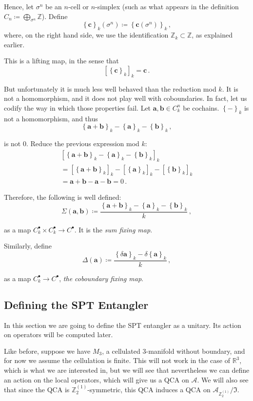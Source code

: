 \documentclass[aps,twocolumn,prx,floatfix,preprintnumbers, nofootinbib,10pt]{revtex4-2}
\numberwithin{equation}{section}
\theoremstyle{definition}
\theoremstyle{remark}
\theoremstyle{claim}
\newcommand{\be}{\begin{equation}}
\newcommand{\ee}{\end{equation}}
\newcommand{\lbb}{\left[}
\newcommand{\rbb}{\right]}
\newcommand{\lbbb}{\left\{}
\newcommand{\rbbb}{\right\}}
\newcommand{\Z}{{\mathbb Z}}
\newcommand{\mc}[1]{\mathcal{#1}}
\begin{document}
Hence, let $\sigma^n$ be an $n$-cell or $n$-simplex (such as what appears in the definition $C_n \coloneqq \bigoplus_{\sigma^n} \Z$). Define
\be
\lbbb \bm{c} \rbbb_k (\sigma^n) \coloneqq \lbbb \bm{c}(\sigma^n) \rbbb_k \,,
\ee
where, on the right hand side, we use the identification $\Z_k \subset \Z$, as explained earlier.

This is a lifting map, in the sense that
\be
\lbb \lbbb \bm{c} \rbbb_k \rbb_k = \bm{c} \,.
\ee

But unfortunately it is much less well behaved than the reduction mod $k$. It is not a homomorphism, and it does not play well with coboundaries. In fact, let us codify the way in which those properties fail. Let $\bm{a}, \bm{b} \in C^n_k$ be cochains. $\lbbb - \rbbb_k$ is not a homomorphism, and thus
\be
\lbbb \bm{a} + \bm{b} \rbbb_k - \lbbb \bm{a} \rbbb_k - \lbbb \bm{b} \rbbb_k \,,
\ee

is not 0. Reduce the previous expression mod $k$:
\begin{multline}
 \lbb \lbbb \bm{a} + \bm{b} \rbbb_k - \lbbb \bm{a} \rbbb_k - \lbbb \bm{b} \rbbb_k \rbb_k \\
 = \lbb \lbbb \bm{a} + \bm{b} \rbbb_k \rbb_k - \lbb \lbbb \bm{a} \rbbb_k \rbb_k - \lbb \lbbb \bm{b} \rbbb_k \rbb_k \\
 = \bm{a} + \bm{b} - \bm{a} - \bm{b} = 0 \,.
\end{multline}

Therefore, the following is well defined:
\be
\Sigma(\bm{a}, \bm{b}) \coloneqq \frac{\lbbb \bm{a} + \bm{b} \rbbb_k - \lbbb \bm{a} \rbbb_k - \lbbb \bm{b} \rbbb_k}{k} \,,
\ee

as a map $C^\bullet_k \times C^\bullet_k \rightarrow C^\bullet$. It is the \emph{sum fixing map}.

Similarly, define
\be
\Delta(\bm{a}) \coloneqq \frac{\lbbb \delta \bm{a} \rbbb_k - \delta \lbbb \bm{a} \rbbb_k}{k} \,,
\ee

as a map $C^\bullet_k \rightarrow C^\bullet$, \emph{the coboundary fixing map}.

\subsection{Defining the SPT Entangler}

In this section we are going to define the SPT entangler as a unitary. Its action on operators will be computed later.

Like before, suppose we have $M_3$, a cellulated 3-manifold without boundary, and for now we assume the cellulation is finite. This will not work in the case of $\mathbb{R}^3$, which is what we are interested in, but we will see that nevertheless we can define an action on the local operators, which will give us a QCA on $\mc{A}$. We will also see that since the QCA is $\Z_2^{(1)}$-symmetric, this QCA induces a QCA on $\mc{A}_{\Z_2^{(1)}} / \mathfrak{I}$.
\end{document}
